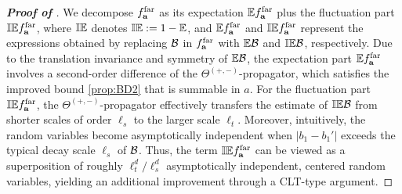 \begin{proof}[\bf Proof of ]
We decompose $f_{\ba}^{\mathrm{far}}$ as its expectation $\E f_{\ba}^{\mathrm{far}}$ plus the fluctuation part $\IE f_{\ba}^{\mathrm{far}}$, where $\IE$ denotes $\mathbb {IE}:=1-\E$, and $\E f_{\ba}^{\mathrm{far}}$ and $\IE f_{\ba}^{\mathrm{far}}$ represent the expressions obtained by replacing $\cal B$ in $f_{\ba}^{\mathrm{far}}$ with $\E\cal B$ and $\IE \cal B$, respectively. 
Due to the translation invariance and symmetry of $\E\cal B$, the expectation part $\E f_{\ba}^{\mathrm{far}}$ involves a second-order difference of the $\Theta^{(+,-)}$-propagator, which satisfies the improved bound \eqref{prop:BD2} that is summable in $a$. 
For the fluctuation part $\IE f_{\ba}^{\mathrm{far}}$, the $\Theta^{(+,-)}$-propagator effectively transfers the estimate of $\IE \cal B$ from shorter scales of order $\ell_s$ to the larger scale $\ell_t$. Moreover, intuitively, the random variables  become asymptotically independent when $|b_1-b_1'|$ exceeds the typical decay scale $\ell_s$ of $\cal B$. 
Thus, the term $\IE f_{\ba}^{\mathrm{far}}$ can be viewed as a superposition of roughly $\ell_t^d/\ell_s^d$ asymptotically independent, centered random variables, yielding an additional improvement through a CLT-type argument. 





\end{proof}

